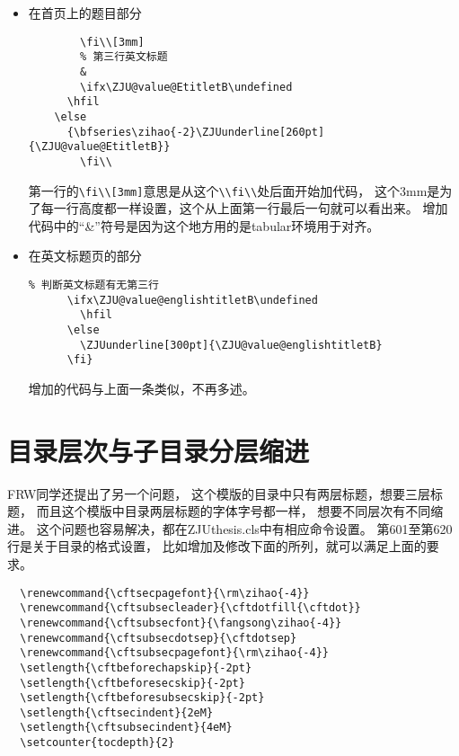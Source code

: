 \begin{itemize}
\item{在首页上的题目部分}

{
\begin{verbatim}
        \fi\\[3mm]
        % 第三行英文标题
        &
        \ifx\ZJU@value@EtitletB\undefined
	  \hfil
	\else
	  {\bfseries\zihao{-2}\ZJUunderline[260pt]{\ZJU@value@EtitletB}}
        \fi\\
\end{verbatim}
}
第一行的\verb+\fi\\[3mm]+意思是从这个\verb+\\fi\\+处后面开始加代码，
这个3mm是为了每一行高度都一样设置，这个从上面第一行最后一句就可以看出来。
增加代码中的“\&”符号是因为这个地方用的是tabular环境用于对齐。

\item{在英文标题页的部分}

{
\begin{verbatim}
% 判断英文标题有无第三行
      \ifx\ZJU@value@englishtitletB\undefined
        \hfil
      \else
        \ZJUunderline[300pt]{\ZJU@value@englishtitletB}
      \fi}
\end{verbatim}
}

增加的代码与上面一条类似，不再多述。

\end{itemize}


\section{目录层次与子目录分层缩进}

FRW同学还提出了另一个问题，
这个模版的目录中只有两层标题，想要三层标题，
而且这个模版中目录两层标题的字体字号都一样，
想要不同层次有不同缩进。
这个问题也容易解决，都在ZJUthesis.cls中有相应命令设置。
第601至第620行是关于目录的格式设置，
比如增加及修改下面的所列，就可以满足上面的要求。

{
\begin{verbatim}
  \renewcommand{\cftsecpagefont}{\rm\zihao{-4}}
  \renewcommand{\cftsubsecleader}{\cftdotfill{\cftdot}}
  \renewcommand{\cftsubsecfont}{\fangsong\zihao{-4}}
  \renewcommand{\cftsubsecdotsep}{\cftdotsep}
  \renewcommand{\cftsubsecpagefont}{\rm\zihao{-4}}
  \setlength{\cftbeforechapskip}{-2pt}
  \setlength{\cftbeforesecskip}{-2pt}
  \setlength{\cftbeforesubsecskip}{-2pt}
  \setlength{\cftsecindent}{2eM}
  \setlength{\cftsubsecindent}{4eM}
  \setcounter{tocdepth}{2}
\end{verbatim}
}

